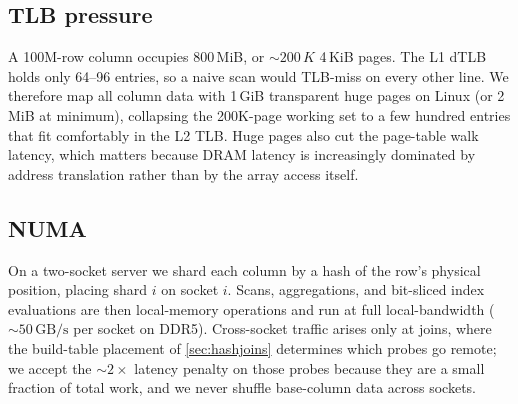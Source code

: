 \documentclass[10pt]{article}
\theoremstyle{definition}
\begin{document}
\subsection{TLB pressure}

A 100M-row column occupies 800\,MiB, or $\sim\!200\,K$ 4\,KiB pages. The L1 dTLB holds only 64--96 entries, so a naive scan would TLB-miss on every other line. We therefore map all column data with 1\,GiB transparent huge pages on Linux (or 2\,MiB at minimum), collapsing the 200K-page working set to a few hundred entries that fit comfortably in the L2 TLB. Huge pages also cut the page-table walk latency, which matters because DRAM latency is increasingly dominated by address translation rather than by the array access itself.

\subsection{NUMA}

On a two-socket server we shard each column by a hash of the row's physical position, placing shard $i$ on socket $i$. Scans, aggregations, and bit-sliced index evaluations are then local-memory operations and run at full local-bandwidth ($\sim\!50\,\text{GB/s}$ per socket on DDR5). Cross-socket traffic arises only at joins, where the build-table placement of \cref{sec:hashjoins} determines which probes go remote; we accept the $\sim\!2\times$ latency penalty on those probes because they are a small fraction of total work, and we never shuffle base-column data across sockets.
\end{document}
